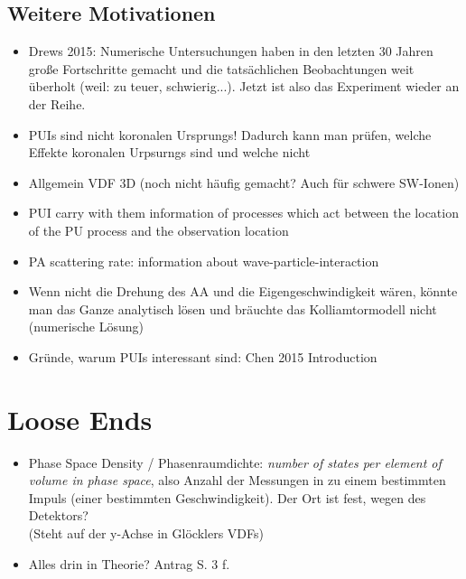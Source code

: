 \documentclass[]{article}
\begin{document}
\subsection{Weitere Motivationen}
\begin{itemize}
	\item Drews 2015: Numerische Untersuchungen haben in den letzten 30 Jahren große Fortschritte gemacht und die tatsächlichen Beobachtungen weit überholt (weil: zu teuer, schwierig...). Jetzt ist also das Experiment wieder an der Reihe. 
	\item PUIs sind nicht koronalen Ursprungs! Dadurch kann man prüfen, welche Effekte koronalen Urpsurngs sind und welche nicht
	\item Allgemein VDF 3D (noch nicht häufig gemacht? Auch für schwere SW-Ionen)
	\item PUI carry with them information of processes which act between the location of the PU process and the observation location
	\item PA scattering rate: information about wave-particle-interaction 
	\item Wenn nicht die Drehung des AA und die Eigengeschwindigkeit wären, könnte man das Ganze analytisch lösen und bräuchte das Kolliamtormodell nicht (numerische Lösung)
	\item Gründe, warum PUIs interessant sind: Chen 2015 Introduction
\end{itemize}
%
%
%
\newpage
\section{Loose Ends}
\begin{itemize}
	\item Phase Space Density / Phasenraumdichte: \textit{number of states per element of volume in phase space}, also Anzahl der Messungen in zu einem bestimmten Impuls (einer bestimmten Geschwindigkeit). Der Ort ist fest, wegen des Detektors?\\
	(Steht auf der y-Achse in Glöcklers VDFs)
	\item Alles drin in Theorie? Antrag S. 3 f.
\end{itemize}
%
%
%
\newpage
\end{document}
